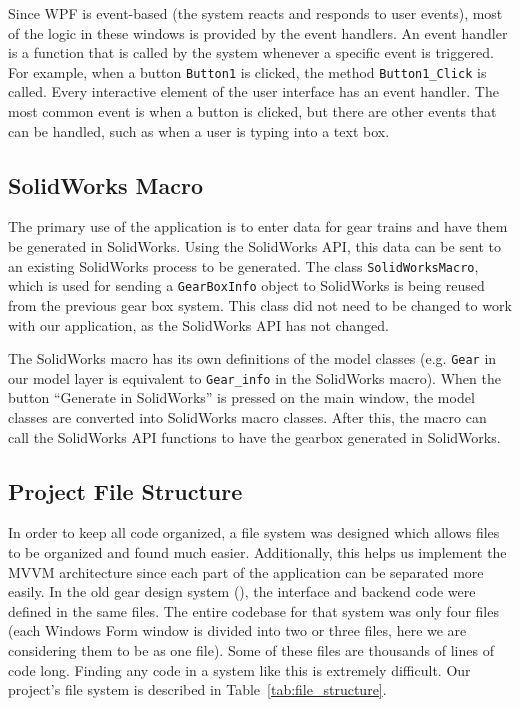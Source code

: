 \begin{doublespace}
Since WPF is event-based (the system reacts and responds to user events), most of the logic in these windows is provided by the event handlers. An event handler is a function that is called by the system whenever a specific event is triggered. For example, when a button \texttt{Button1} is clicked, the method \texttt{Button1\_Click} is called. Every interactive element of the user interface has an event handler. The most common event is when a button is clicked, but there are other events that can be handled, such as when a user is typing into a text box.

\subsection{SolidWorks Macro}
The primary use of the application is to enter data for gear trains and have them be generated in SolidWorks. Using the SolidWorks API, this data can be sent to an existing SolidWorks process to be generated. The class \texttt{SolidWorksMacro}, which is used for sending a \texttt{GearBoxInfo} object to SolidWorks is being reused from the previous gear box system. This class did not need to be changed to work with our application, as the SolidWorks API has not changed.

The SolidWorks macro has its own definitions of the model classes (e.g. \texttt{Gear} in our model layer is equivalent to \texttt{Gear\_info} in the SolidWorks macro). When the button ``Generate in SolidWorks'' is pressed on the main window, the model classes are converted into SolidWorks macro classes. After this, the macro can call the SolidWorks API functions to have the gearbox generated in SolidWorks.

\subsection{Project File Structure}

In order to keep all code organized, a file system was designed which allows files to be organized and found much easier. Additionally, this helps us implement the MVVM architecture since each part of the application can be separated more easily. In the old gear design system (\cite{holman_automated_2018}), the interface and backend code were defined in the same files. The entire codebase for that system was only four files (each Windows Form window is divided into two or three files, here we are considering them to be as one file). Some of these files are thousands of lines of code long. Finding any code in a system like this is extremely difficult. Our project's file system is described in Table~\ref{tab:file_structure}.


\end{doublespace}
